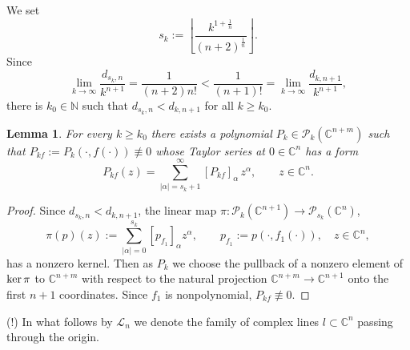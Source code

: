 \documentclass[11pt, oneside]{amsart}
\newtheorem{Lm}[Th]{Lemma}
\begin{document}
We set
\begin{equation}\label{eq2.10}
s_k:=\left\lfloor\frac{k^{1+\frac 1n}}{(n+2)^{\frac 1n}}\right\rfloor.
\end{equation}
Since
\[
\lim_{k\rightarrow\infty}\frac{d_{s_k, n}}{k^{n+1}}=\frac{1}{(n+2)n!}<\frac{1}{(n+1)!}=\lim_{k\rightarrow\infty}\frac{d_{k,n+1}}{k^{n+1}},
\]
there is $k_0\in\mathbb N$ such that $d_{s_k,n} <d_{k,n+1}$ for all $k \ge k_0$. 
\begin{Lm}\label{lem2.3}
For every $k\ge k_0$ there exists a polynomial $P_k\in\mathcal P_k(\mathbb C^{n+m})$ such that $P_{k f}:=P_k(\cdot,f(\cdot))\not\equiv 0$ whose Taylor series at $0\in\mathbb C^n$ has a form 
\[
P_{k f}(z)=\sum_{|\alpha|=s_k+1}^\infty  [P_{k f}]_\alpha\,z^\alpha,\qquad z\in\mathbb C^n.
\]
\end{Lm}
\begin{proof}
Since $d_{s_k,n}<d_{k,n+1}$, the linear map $\pi:\mathcal P_{k}(\mathbb C^{n+1})\rightarrow\mathcal P_{s_k}(\mathbb C^n)$, 
\[
\pi(p)(z):=\sum_{|\alpha|=0}^{s_k}[p_{f_1}]_\alpha z^\alpha,\qquad p_{f_1}:=p(\cdot,f_1(\cdot)),\quad z\in\mathbb C^n,
\] 
has a nonzero kernel. Then as $P_k$ we choose the pullback of a nonzero element of ${\rm ker}\,\pi$ to $\mathbb C^{n+m}$ with respect to the natural projection $\mathbb C^{n+m}\rightarrow\mathbb C^{n+1}$ onto the first $n+1$ coordinates. Since $f_1$ is nonpolynomial, $P_{kf}\not\equiv 0$.
\end{proof}

\noindent (!) In what follows by $\mathcal L_n$  we denote the family of complex lines $l\subset\mathbb C^n$  passing through the origin.\smallskip
\end{document}
